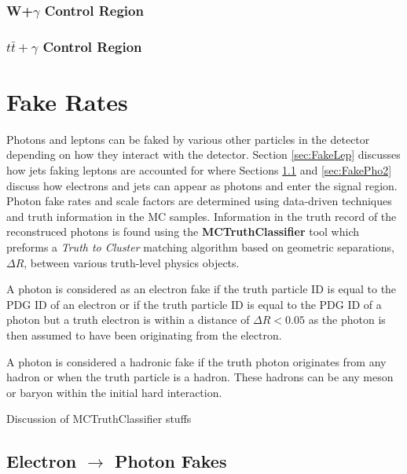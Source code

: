 \subsubsection{W+$\gamma$ Control Region}

\subsubsection{$t\bar{t}+\gamma$ Control Region}


\section{Fake Rates}
\label{sec:Fakes}

Photons and leptons can be faked by various other particles in the detector depending on how they interact with the detector.  Section \ref{sec:FakeLep} discusses how jets faking leptons are accounted for where Sections \ref{sec:FakePho} and \ref{sec:FakePho2} discuss how electrons and jets can appear as photons and enter the signal region.  Photon fake rates and scale factors are determined using data-driven techniques and truth information in the MC samples.  Information in the truth record of the reconstruced photons is found using the \textbf{MCTruthClassifier} tool which preforms a \textit{Truth to Cluster} matching algorithm based on geometric separations, $\Delta R$, between various truth-level physics objects.

A photon is considered as an electron fake if the truth particle ID is equal to the PDG ID of an electron or if the truth particle ID is equal to the PDG ID of a photon but a truth electron is within a distance of $\Delta R < 0.05$ as the photon is then assumed to have been originating from the electron.  

A photon is considered a hadronic fake if the truth photon originates from any hadron or when the truth particle is a hadron.  These hadrons can be any meson or baryon within the initial hard interaction.


Discussion of MCTruthClassifier stuffs%
\subsection{Electron $\rightarrow$ Photon Fakes}
\label{sec:FakePho}

